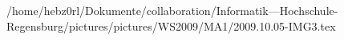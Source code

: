 /home/hebz0rl/Dokumente/collaboration/Informatik---Hochschule-Regensburg/pictures/pictures/WS2009/MA1/2009.10.05-IMG3.tex